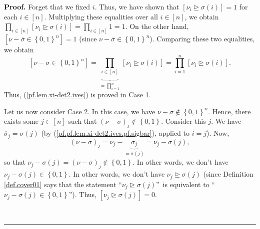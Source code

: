 \documentclass
[numbers=enddot,12pt,final,onecolumn,notitlepage,english]{scrartcl}%
\theoremstyle{definition}
\newenvironment{proof}[1][Proof]{\noindent\textbf{#1.} }{\ \rule{0.5em}{0.5em}}
\let\prodnonlimits\prod
\renewcommand{\prod}{\prodnonlimits\limits}
\newenvironment{verlong}{}{}
\begin{document}
\begin{verlong}
\begin{proof}
Forget that we fixed $i$. Thus, we have shown that $\left[  \nu_{i}%
\trianglerighteq\sigma\left(  i\right)  \right]  =1$ for each $i\in\left[
n\right]  $. Multiplying these equalities over all $i\in\left[  n\right]  $,
we obtain $\prod_{i\in\left[  n\right]  }\left[  \nu_{i}\trianglerighteq
\sigma\left(  i\right)  \right]  =\prod_{i\in\left[  n\right]  }1=1$. On the
other hand, $\left[  \nu-\overline{\sigma}\in\left\{  0,1\right\}
^{n}\right]  =1$ (since $\nu-\overline{\sigma}\in\left\{  0,1\right\}  ^{n}$).
Comparing these two equalities, we obtain%
\[
\left[  \nu-\overline{\sigma}\in\left\{  0,1\right\}  ^{n}\right]
=\underbrace{\prod_{i\in\left[  n\right]  }}_{=\prod_{i=1}^{n}}\left[  \nu
_{i}\trianglerighteq\sigma\left(  i\right)  \right]  =\prod_{i=1}^{n}\left[
\nu_{i}\trianglerighteq\sigma\left(  i\right)  \right]  .
\]
Thus, (\ref{pf.lem.xi-det2.ives}) is proved in Case 1. \medskip

Let us now consider Case 2. In this case, we have $\nu-\overline{\sigma}%
\notin\left\{  0,1\right\}  ^{n}$. Hence, there exists some $j\in\left[
n\right]  $ such that $\left(  \nu-\overline{\sigma}\right)  _{j}%
\notin\left\{  0,1\right\}  $. Consider this $j$. We have $\overline{\sigma
}_{j}=\sigma\left(  j\right)  $ (by (\ref{pf.pf.lem.xi-det2.ives.pf.sigbar}),
applied to $i=j$). Now,
\[
\left(  \nu-\overline{\sigma}\right)  _{j}=\nu_{j}-\underbrace{\overline
{\sigma}_{j}}_{=\sigma\left(  j\right)  }=\nu_{j}-\sigma\left(  j\right)  ,
\]
so that $\nu_{j}-\sigma\left(  j\right)  =\left(  \nu-\overline{\sigma
}\right)  _{j}\notin\left\{  0,1\right\}  $. In other words, we don't have
$\nu_{j}-\sigma\left(  j\right)  \in\left\{  0,1\right\}  $. In other words,
we don't have $\nu_{j}\trianglerighteq\sigma\left(  j\right)  $ (since
Definition \ref{def.cover01} says that the statement \textquotedblleft$\nu
_{j}\trianglerighteq\sigma\left(  j\right)  $\textquotedblright\ is equivalent
to \textquotedblleft$\nu_{j}-\sigma\left(  j\right)  \in\left\{  0,1\right\}
$\textquotedblright). Thus, $\left[  \nu_{j}\trianglerighteq\sigma\left(
j\right)  \right]  =0$.


\end{proof}
\end{verlong}
\end{document}

